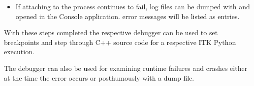 \begin{enumerate}
\begin{itemize}
\begin{itemize}
\item If attaching to the process continues to fail, log files can
be dumped with  and opened in the Console application.
 error messages will be listed as  entries.

\end{itemize}

\end{itemize}

\end{enumerate}

With these steps completed the respective debugger can be used to set breakpoints
and step through C++ source code for a respective ITK Python execution.

The debugger can also be used for examining runtime failures and crashes
either at the time the error occurs or posthumously with a dump file.

